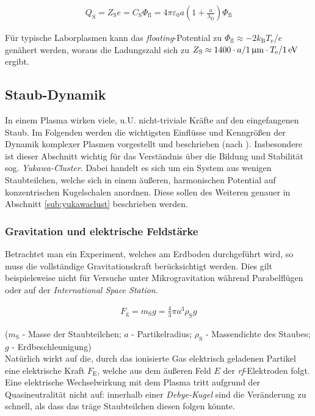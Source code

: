 \documentclass[numbers=noenddot,a4paper]{scrartcl}
\newcommand{\ix}[1]{_\text{#1}}
\newcommand{\tilt}[1]{\textit{#1}}
\begin{document}
				\begin{align}
					Q\ix{S}=Z\ix{S}e=C\ix{S}\Phi\ix{fl}=4\pi\varepsilon\ix{0}a\left(1+\frac{a}{\lambda\ix{D}}\right)\Phi\ix{fl} \label{eq:ladung}
				\end{align}

			Für typische Laborplasmen kann das \tilt{floating}-Potential zu $\Phi\ix{fl}\approx-2k\ix{B}T\ix{e}/e$ genähert werden, woraus die Ladungszahl sich zu $Z\ix{S}\approx1400\cdot a/\unit[1]{\upmu m}\cdot T\ix{e}/\unit[1]{eV}$ ergibt.

		\subsection{Staub-Dynamik}\label{sub:dynamik}

			In einem Plasma wirken viele, u.U. nicht-triviale Kräfte auf den eingefangenen Staub. Im Folgenden werden die wichtigsten Einflüsse und Kenngrößen der Dynamik komplexer Plasmen vorgestellt und beschrieben (nach \cite{Melzer10}). Insbesondere ist dieser Abschnitt wichtig für das Verständnis über die Bildung und Stabilität sog. \tilt{Yukawa-Cluster}. Dabei handelt es sich um ein System aus wenigen Staubteilchen, welche sich in einem äußeren, harmonischen Potential auf konzentrischen Kugelschalen anordnen. Diese sollen des Weiteren genauer in Abschnitt \ref{sub:yukawaclust} beschrieben werden.

			\subsubsection{Gravitation und elektrische Feldstärke}\label{subsub:grav}

			Betrachtet man ein Experiment, welches am Erdboden durchgeführt wird, so muss die vollständige Gravitationskraft berücksichtigt werden. Dies gilt beispielsweise nicht für Versuche unter Mikrogravitation während Parabelflügen oder auf der \tilt{International Space Station}.

				\begin{align}
					F\ix{g}=m\ix{S} g=\frac{4}{3}\pi a^3 \rho\ix{S} g
				\end{align}

			($m\ix{S}$ - Masse der Staubteilchen; $a$ - Partikelradius; $\rho\ix{S}$ - Massendichte des Staubes; $g$ - \mbox{Erdbeschleunigung})\\
			Natürlich wirkt auf die, durch das ionisierte Gas elektrisch geladenen Partikel eine elektrische Kraft $F\ix{E}$, welche aus dem äußeren Feld $E$ der \tilt{rf}-Elektroden folgt. Eine elektrische Wechselwirkung mit dem Plasma tritt aufgrund der Quasineutralität nicht auf: innerhalb einer \tilt{Debye-Kugel} sind die Veränderung zu schnell, als dass das träge Staubteilchen diesen folgen könnte. 
\end{document}
